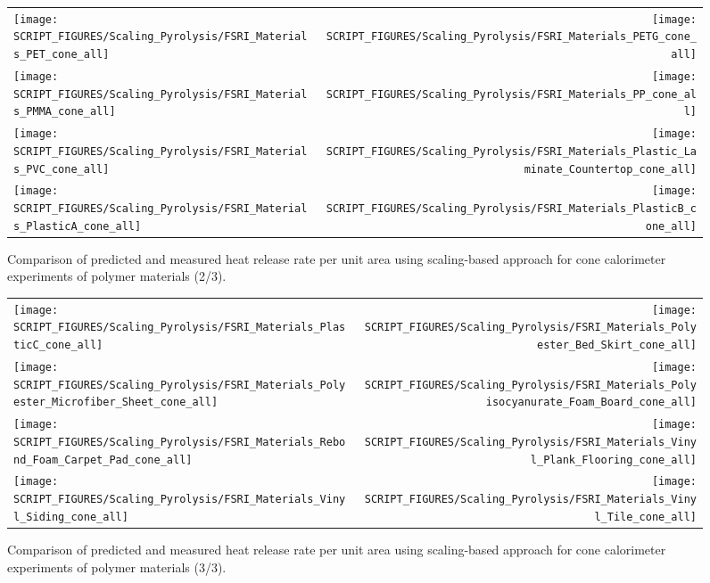 \begin{figure}[p]
\begin{tabular*}{\textwidth}{l@{\extracolsep{\fill}}r}
\texttt{[image: SCRIPT\_FIGURES/Scaling\_Pyrolysis/FSRI\_Materials\_PET\_cone\_all]} &
\texttt{[image: SCRIPT\_FIGURES/Scaling\_Pyrolysis/FSRI\_Materials\_PETG\_cone\_all]} \\
\texttt{[image: SCRIPT\_FIGURES/Scaling\_Pyrolysis/FSRI\_Materials\_PMMA\_cone\_all]} &
\texttt{[image: SCRIPT\_FIGURES/Scaling\_Pyrolysis/FSRI\_Materials\_PP\_cone\_all]} \\
\texttt{[image: SCRIPT\_FIGURES/Scaling\_Pyrolysis/FSRI\_Materials\_PVC\_cone\_all]} &
\texttt{[image: SCRIPT\_FIGURES/Scaling\_Pyrolysis/FSRI\_Materials\_Plastic\_Laminate\_Countertop\_cone\_all]} \\
\texttt{[image: SCRIPT\_FIGURES/Scaling\_Pyrolysis/FSRI\_Materials\_PlasticA\_cone\_all]} &
\texttt{[image: SCRIPT\_FIGURES/Scaling\_Pyrolysis/FSRI\_Materials\_PlasticB\_cone\_all]} \\
\end{tabular*}
\caption[HRRPUA of FSRI materials using scaling model, polymer materials]
{Comparison of predicted and measured heat release rate per unit area using scaling-based approach for cone calorimeter experiments of polymer materials (2/3).}
\label{FSRI_Materials_polymers2}
\end{figure}

\begin{figure}[p]
\begin{tabular*}{\textwidth}{l@{\extracolsep{\fill}}r}
\texttt{[image: SCRIPT\_FIGURES/Scaling\_Pyrolysis/FSRI\_Materials\_PlasticC\_cone\_all]} &
\texttt{[image: SCRIPT\_FIGURES/Scaling\_Pyrolysis/FSRI\_Materials\_Polyester\_Bed\_Skirt\_cone\_all]} \\
\texttt{[image: SCRIPT\_FIGURES/Scaling\_Pyrolysis/FSRI\_Materials\_Polyester\_Microfiber\_Sheet\_cone\_all]} &
\texttt{[image: SCRIPT\_FIGURES/Scaling\_Pyrolysis/FSRI\_Materials\_Polyisocyanurate\_Foam\_Board\_cone\_all]} \\
\texttt{[image: SCRIPT\_FIGURES/Scaling\_Pyrolysis/FSRI\_Materials\_Rebond\_Foam\_Carpet\_Pad\_cone\_all]} &
\texttt{[image: SCRIPT\_FIGURES/Scaling\_Pyrolysis/FSRI\_Materials\_Vinyl\_Plank\_Flooring\_cone\_all]} \\
\texttt{[image: SCRIPT\_FIGURES/Scaling\_Pyrolysis/FSRI\_Materials\_Vinyl\_Siding\_cone\_all]} &
\texttt{[image: SCRIPT\_FIGURES/Scaling\_Pyrolysis/FSRI\_Materials\_Vinyl\_Tile\_cone\_all]} \\
\end{tabular*}
\caption[HRRPUA of FSRI materials using scaling model, polymer materials]
{Comparison of predicted and measured heat release rate per unit area using scaling-based approach for cone calorimeter experiments of polymer materials (3/3).}
\label{FSRI_Materials_polymers3}
\end{figure}


